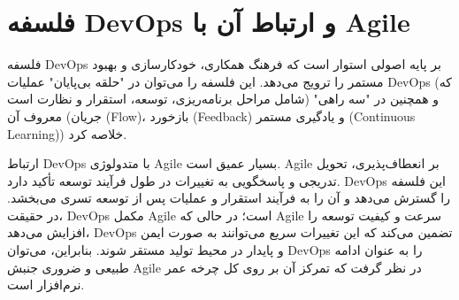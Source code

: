 \section{فلسفه DevOps و ارتباط آن با Agile}
فلسفه DevOps بر پایه اصولی استوار است که فرهنگ همکاری، خودکارسازی و بهبود مستمر را ترویج می‌دهد. این فلسفه را می‌توان در "حلقه بی‌پایان" عملیات DevOps (که شامل مراحل برنامه‌ریزی، توسعه، استقرار و نظارت است) و همچنین در "سه راهی" معروف آن (جریان (Flow)، بازخورد (Feedback) و یادگیری مستمر (Continuous Learning)) خلاصه کرد.

ارتباط DevOps با متدولوژی Agile بسیار عمیق است. Agile بر انعطاف‌پذیری، تحویل تدریجی و پاسخگویی به تغییرات در طول فرآیند توسعه تأکید دارد. DevOps این فلسفه را گسترش می‌دهد و آن را به فرآیند استقرار و عملیات پس از توسعه تسری می‌بخشد. در حقیقت، DevOps مکمل Agile است؛ در حالی که Agile سرعت و کیفیت توسعه را افزایش می‌دهد، DevOps تضمین می‌کند که این تغییرات سریع می‌توانند به صورت ایمن و پایدار در محیط تولید مستقر شوند. بنابراین، می‌توان DevOps را به عنوان ادامه طبیعی و ضروری جنبش Agile در نظر گرفت که تمرکز آن بر روی کل چرخه عمر نرم‌افزار است.

